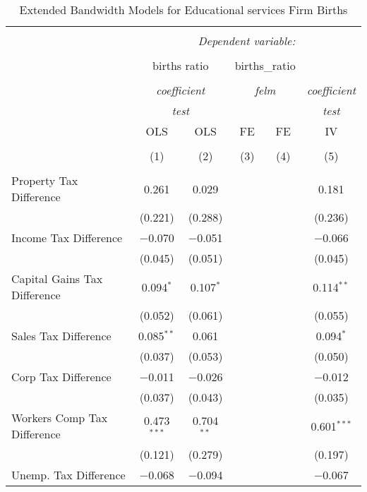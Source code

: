 
\begin{table}[!htbp] \centering 
  \caption{Extended Bandwidth Models for  Educational services Firm Births} 
  \label{} 
\begin{tabular}{@{\extracolsep{5pt}}lccccc} 
\\[-1.8ex]\hline 
\hline \\[-1.8ex] 
 & \multicolumn{5}{c}{\textit{Dependent variable:}} \\ 
\cline{2-6} 
\\[-1.8ex] & \multicolumn{2}{c}{births ratio} & \multicolumn{2}{c}{births\_ratio} &   \\ 
\\[-1.8ex] & \multicolumn{2}{c}{\textit{coefficient}} & \multicolumn{2}{c}{\textit{felm}} & \textit{coefficient} \\ 
 & \multicolumn{2}{c}{\textit{test}} & \multicolumn{2}{c}{\textit{}} & \textit{test} \\ 
 & OLS & OLS & FE & FE & IV \\ 
\\[-1.8ex] & (1) & (2) & (3) & (4) & (5)\\ 
\hline \\[-1.8ex] 
 Property Tax Difference & 0.261 & 0.029 &  &  & 0.181 \\ 
  & (0.221) & (0.288) &  &  & (0.236) \\ 
  Income Tax Difference & $-$0.070 & $-$0.051 &  &  & $-$0.066 \\ 
  & (0.045) & (0.051) &  &  & (0.045) \\ 
  Capital Gains Tax Difference & 0.094$^{*}$ & 0.107$^{*}$ &  &  & 0.114$^{**}$ \\ 
  & (0.052) & (0.061) &  &  & (0.055) \\ 
  Sales Tax Difference & 0.085$^{**}$ & 0.061 &  &  & 0.094$^{*}$ \\ 
  & (0.037) & (0.053) &  &  & (0.050) \\ 
  Corp Tax Difference & $-$0.011 & $-$0.026 &  &  & $-$0.012 \\ 
  & (0.037) & (0.043) &  &  & (0.035) \\ 
  Workers Comp Tax Difference & 0.473$^{***}$ & 0.704$^{**}$ &  &  & 0.601$^{***}$ \\ 
  & (0.121) & (0.279) &  &  & (0.197) \\ 
  Unemp. Tax Difference & $-$0.068 & $-$0.094 &  &  & $-$0.067 \\ 

\end{tabular}
\end{table}
